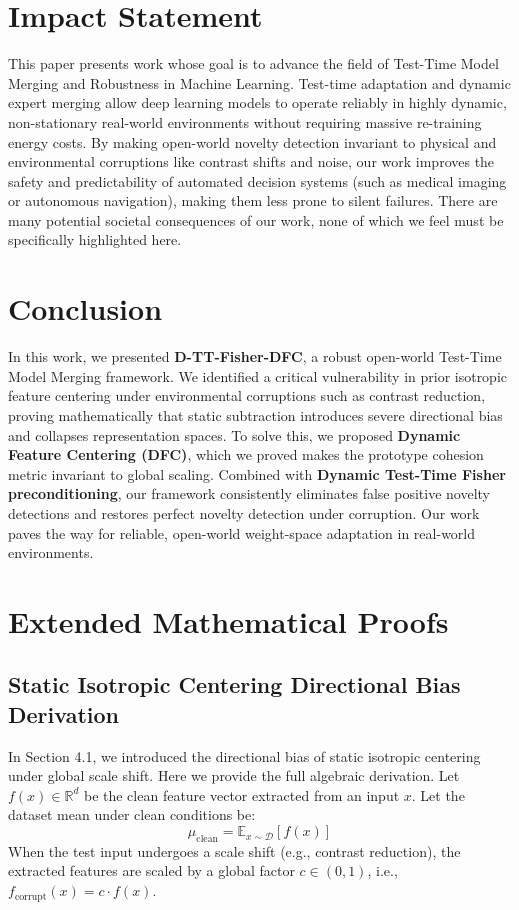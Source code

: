 \documentclass{article}
\theoremstyle{plain}
\theoremstyle{definition}
\theoremstyle{remark}
\begin{document}
\section*{Impact Statement}
This paper presents work whose goal is to advance the field of Test-Time Model Merging and Robustness in Machine Learning. Test-time adaptation and dynamic expert merging allow deep learning models to operate reliably in highly dynamic, non-stationary real-world environments without requiring massive re-training energy costs. By making open-world novelty detection invariant to physical and environmental corruptions like contrast shifts and noise, our work improves the safety and predictability of automated decision systems (such as medical imaging or autonomous navigation), making them less prone to silent failures. There are many potential societal consequences of our work, none of which we feel must be specifically highlighted here.

\section{Conclusion}
\label{sec:conclusion}
In this work, we presented \textbf{D-TT-Fisher-DFC}, a robust open-world Test-Time Model Merging framework. We identified a critical vulnerability in prior isotropic feature centering under environmental corruptions such as contrast reduction, proving mathematically that static subtraction introduces severe directional bias and collapses representation spaces. To solve this, we proposed \textbf{Dynamic Feature Centering (DFC)}, which we proved makes the prototype cohesion metric invariant to global scaling. Combined with \textbf{Dynamic Test-Time Fisher preconditioning}, our framework consistently eliminates false positive novelty detections and restores perfect novelty detection under corruption. Our work paves the way for reliable, open-world weight-space adaptation in real-world environments.

\newpage



\newpage
\appendix
\onecolumn
\section{Extended Mathematical Proofs}
\subsection{Static Isotropic Centering Directional Bias Derivation}
In Section 4.1, we introduced the directional bias of static isotropic centering under global scale shift. Here we provide the full algebraic derivation.
Let $f(x) \in \mathbb{R}^d$ be the clean feature vector extracted from an input $x$. Let the dataset mean under clean conditions be:
\begin{equation}
  \mu_{\text{clean}} = \mathbb{E}_{x \sim \mathcal{D}}[f(x)]
\end{equation}
When the test input undergoes a scale shift (e.g., contrast reduction), the extracted features are scaled by a global factor $c \in (0, 1)$, i.e., $f_{\text{corrupt}}(x) = c \cdot f(x)$.
\end{document}

